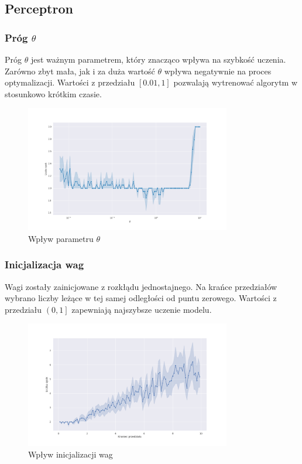 \documentclass{article}
\begin{document}
\pagebreak
\subsection{Perceptron}
\label{headings}

\subsubsection{Próg $\theta$}
Próg $\theta$ jest ważnym parametrem, który znacząco wpływa na szybkość uczenia.
Zarówno zbyt mała, jak i za duża wartość $\theta$ wpływa negatywnie na proces optymalizacji.
Wartości z przedziału $\left[0.01, 1\right]$ pozwalają wytrenować algorytm w stosunkowo krótkim czasie.

\begin{figure}[h]
  \caption{Wpływ parametru $\theta$}
  \centering
    \includegraphics[width=0.8\textwidth]{images/02_per_theta.png}
\end{figure}

\FloatBarrier
\subsubsection{Inicjalizacja wag}

Wagi zostały zainicjowane z rozkłądu jednostajnego.
Na krańce przedziałów wybrano liczby leżące w tej samej odległości od puntu zerowego.
Wartości z przedziału $\left(0, 1\right]$ zapewniają najszybsze uczenie modelu.

\begin{figure}[h]
  \caption{Wpływ inicjalizacji wag}
  \centering
    \includegraphics[width=0.8\textwidth]{images/03_per_interval.png}
\end{figure}
\end{document}
